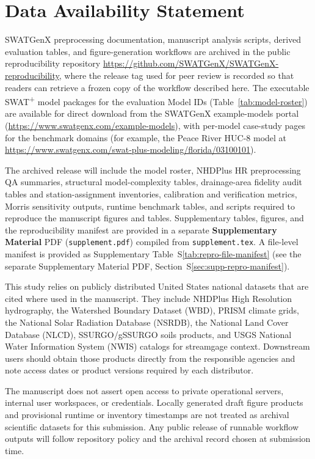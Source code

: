\section*{Data Availability Statement}

\begin{sloppypar}
SWATGenX preprocessing documentation, manuscript analysis scripts, derived evaluation tables, and figure-generation workflows are archived in the public reproducibility repository \url{https://github.com/SWATGenX/SWATGenX-reproducibility}, where the release tag used for peer review is recorded so that readers can retrieve a frozen copy of the workflow described here.
The executable SWAT\textsuperscript{+} model packages for the evaluation Model IDs (Table~\ref{tab:model-roster}) are available for direct download from the SWATGenX example-models portal (\url{https://www.swatgenx.com/example-models}), with per-model case-study pages for the benchmark domains (for example, the Peace River HUC-8 model at \url{https://www.swatgenx.com/swat-plus-modeling/florida/03100101}).

The archived release will include the model roster, NHDPlus HR preprocessing QA summaries, structural model-complexity tables, drainage-area fidelity audit tables and station-assignment inventories, calibration and verification metrics, Morris sensitivity outputs, runtime benchmark tables, and scripts required to reproduce the manuscript figures and tables.
Supplementary tables, figures, and the reproducibility manifest are provided in a separate \textbf{Supplementary Material} PDF (\texttt{supplement.pdf}) compiled from \texttt{supplement.tex}.
A file-level manifest is provided as Supplementary Table~S\ref{tab:repro-file-manifest} (see the separate Supplementary Material PDF, Section~S\ref{sec:supp-repro-manifest}).

This study relies on publicly distributed United States national datasets that are cited where used in the manuscript.
They include NHDPlus High Resolution hydrography, the Watershed Boundary Dataset (WBD), PRISM climate grids, the National Solar Radiation Database (NSRDB), the National Land Cover Database (NLCD), SSURGO/gSSURGO soils products, and USGS National Water Information System (NWIS) catalogs for streamgage context.
Downstream users should obtain those products directly from the responsible agencies and note access dates or product versions required by each distributor.

The manuscript does not assert open access to private operational servers, internal user workspaces, or credentials.
Locally generated draft figure products and provisional runtime or inventory timestamps are not treated as archival scientific datasets for this submission.
Any public release of runnable workflow outputs will follow repository policy and the archival record chosen at submission time.
\end{sloppypar}
